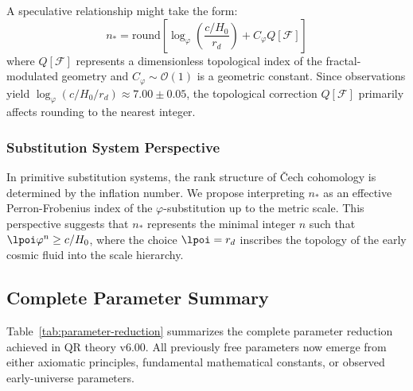 A speculative relationship might take the form:
\begin{equation}
n_* = \text{round}\!\left[\log_\varphi\!\left(\frac{c/H_0}{r_d}\right) + C_\varphi Q[\mathcal{F}]\right]
\label{eq:topological-constraint}
\end{equation}
where $Q[\mathcal{F}]$ represents a dimensionless topological index of the fractal-modulated geometry and $C_\varphi \sim \mathcal{O}(1)$ is a geometric constant. Since observations yield $\log_\varphi(c/H_0/r_d) \approx 7.00 \pm 0.05$, the topological correction $Q[\mathcal{F}]$ primarily affects rounding to the nearest integer.

\subsubsection{Substitution System Perspective}
\label{subsubsec:substitution-system}

In primitive substitution systems, the rank structure of Čech cohomology is determined by the inflation number. We propose interpreting $n_*$ as an effective Perron-Frobenius index of the $\varphi$-substitution up to the metric scale.
This perspective suggests that $n_*$ represents the minimal integer $n$ such that $\lpoi \varphi^n \geq c/H_0$, where the choice $\lpoi = r_d$ inscribes the topology of the early cosmic fluid into the scale hierarchy.

\subsection{Complete Parameter Summary}
\label{subsec:parameter-summary}

Table~\ref{tab:parameter-reduction} summarizes the complete parameter reduction achieved in QR theory v6.00. All previously free parameters now emerge from either axiomatic principles, fundamental mathematical constants, or observed early-universe parameters.

